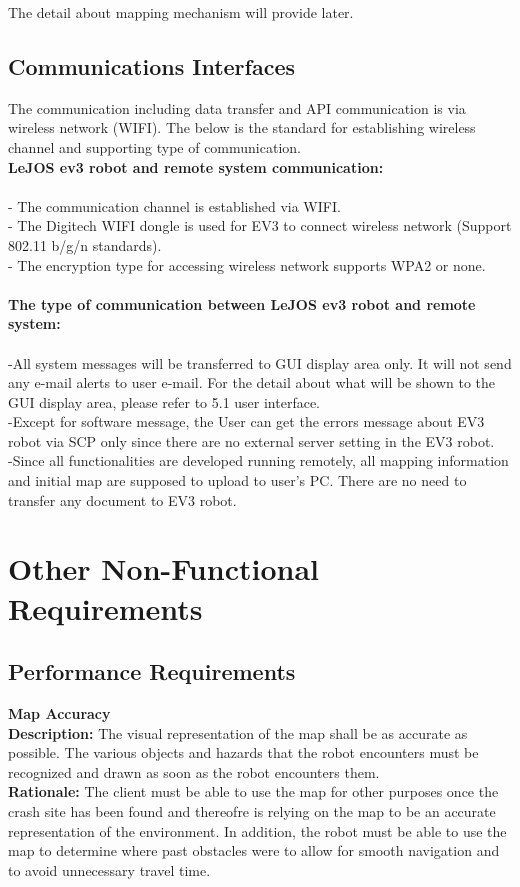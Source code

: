 \documentclass[10pt,a4paper,titlepage]{article}
\begin{document}
The detail about mapping mechanism will provide later.\\

\subsection{Communications Interfaces}

The communication including data transfer and API communication is via wireless network (WIFI). The below is the standard for establishing wireless channel and supporting type of communication.\\

\textbf{LeJOS ev3 robot and remote system communication:}\\\\
-	The communication channel is established via WIFI.\\
-	The Digitech WIFI dongle is used for EV3 to connect wireless network (Support 802.11 b/g/n standards).\\
-	The encryption type for accessing wireless network supports WPA2 or none.\\\\
\textbf{The type of communication between LeJOS ev3 robot and remote system:}\\\\
-All system messages will be transferred to GUI display area only. It will not send any e-mail alerts to user e-mail. For the detail about what will be shown to the GUI display area, please refer to 5.1 user interface.\\
-Except for software message, the User can get the errors message about EV3 robot via SCP only since there are no external server setting in the EV3 robot.\\
-Since all functionalities are developed running remotely, all mapping information and initial map are supposed to upload to user’s PC. There are no need to transfer any document to EV3 robot.\\

	\section{Other Non-Functional Requirements}
	\subsection{Performance Requirements}
		
		\textbf {Map Accuracy}\\
		\textbf {Description:} The visual representation of the map shall be as accurate as possible. The various objects and hazards that the robot encounters must be recognized and drawn as soon as the robot encounters them.\\
		\textbf {Rationale:} The client must be able to use the map for other purposes once the crash site has been found and thereofre is relying on the map to be an accurate representation of the environment. In addition, the robot must be able to use the map to determine where past obstacles were to allow for smooth navigation and to avoid unnecessary travel time.\\
\end{document}
